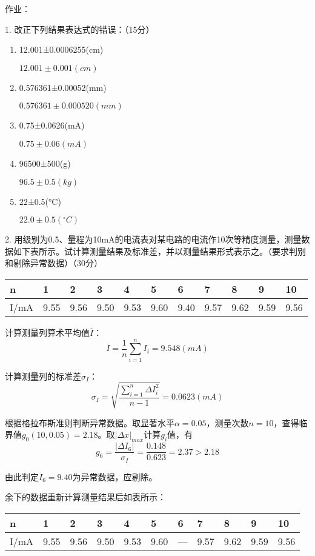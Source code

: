 \documentclass[UTF-8, a4paper, 12pt]{ctexart}
\author{}
\date{}
\begin{document}
  作业：

  1. 改正下列结果表达式的错误：（15分）

  \begin{enumerate}
    \def\labelenumi{(\arabic{enumi})}
    \item
      12.001±0.0006255(cm)

    $12.001 \pm 0.001(cm)$
    \item
      0.576361±0.00052(mm)

    $0.576361\pm 0.000520(mm)$
    \item
      0.75±0.0626(mA)

    $0.75\pm 0.06(mA)$
    \item
      96500±500(g)
    
    $96.5\pm 0.5(kg)$
    \item
      22±0.5(°C)
    
    $22.0\pm 0.5(^\circ C)$
  \end{enumerate}

  2.
  用级别为0.5、量程为10mA的电流表对某电路的电流作10次等精度测量，测量数据如下表所示。试计算测量结果及标准差，并以测量结果形式表示之。（要求判别和剔除异常数据）（30分）

  \begin{longtable}[]{@{}lllllllllll@{}}
    \toprule
    n & 1 & 2 & 3 & 4 & 5 & 6 & 7 & 8 & 9 & 10 \\
    \midrule
    \endhead
    I/mA & 9.55 & 9.56 & 9.50 & 9.53 & 9.60 & 9.40 & 9.57 & 9.62 & 9.59 &
    9.56 \\
    \bottomrule
  \end{longtable}

  计算测量列算术平均值$\overline I$： $$\overline I = \frac 1 n \sum_{i=1}^n I_i = 9.548(mA)$$

  计算测量列的标准差$\sigma_I$： $$\sigma_I = \sqrt{\frac{\sum_{i=1}^n \Delta I_i^2}{n-1}} = 0.0623(mA)$$

  根据格拉布斯准则判断异常数据。取显著水平$\alpha=0.05$，测量次数$n=10$，查得临界值$g_0(10, 0.05) = 2.18$。取$|\Delta x|_{max}$计算$g_i$值，有$$g_6 = \frac{|\Delta I_6|}{\sigma_I} = \frac{0.148}{0.623} = 2.37 > 2.18$$

  由此判定$I_6 = 9.40$为异常数据，应剔除。
  
  余下的数据重新计算测量结果后如表所示：

  \begin{longtable}[]{@{}lllllllllll@{}}
    \toprule
    n & 1 & 2 & 3 & 4 & 5 & 6 & 7 & 8 & 9 & 10 \\
    \midrule
    \endhead
    I/mA & 9.55 & 9.56 & 9.50 & 9.53 & 9.60 & --- & 9.57 & 9.62 & 9.59 &
    9.56 \\
    \bottomrule
  \end{longtable}
\end{document}
